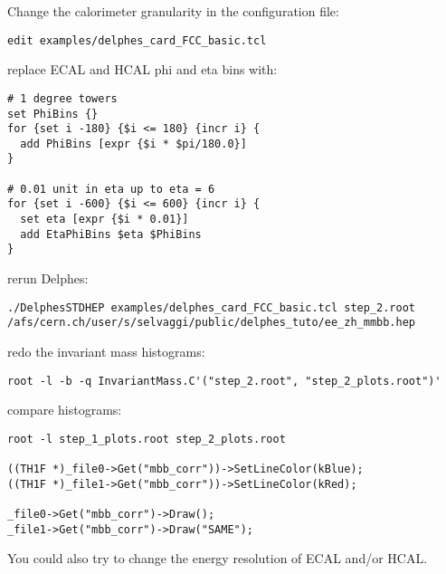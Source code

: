 \documentclass[a4paper,10pt]{article}
\begin{document}
Change the calorimeter granularity in the configuration file:
\begin{lstlisting}
edit examples/delphes_card_FCC_basic.tcl
\end{lstlisting}
replace ECAL and HCAL phi and eta bins with:

\begin{lstlisting}
# 1 degree towers
set PhiBins {}
for {set i -180} {$i <= 180} {incr i} {
  add PhiBins [expr {$i * $pi/180.0}]
}

# 0.01 unit in eta up to eta = 6
for {set i -600} {$i <= 600} {incr i} {
  set eta [expr {$i * 0.01}]
  add EtaPhiBins $eta $PhiBins
}
\end{lstlisting}

rerun Delphes:
\begin{lstlisting}
./DelphesSTDHEP examples/delphes_card_FCC_basic.tcl step_2.root /afs/cern.ch/user/s/selvaggi/public/delphes_tuto/ee_zh_mmbb.hep
\end{lstlisting}
redo the invariant mass histograms:
\begin{lstlisting}
root -l -b -q InvariantMass.C'("step_2.root", "step_2_plots.root")'
\end{lstlisting}
compare histograms:
\begin{lstlisting}
root -l step_1_plots.root step_2_plots.root
  
((TH1F *)_file0->Get("mbb_corr"))->SetLineColor(kBlue);
((TH1F *)_file1->Get("mbb_corr"))->SetLineColor(kRed);
  
_file0->Get("mbb_corr")->Draw();
_file1->Get("mbb_corr")->Draw("SAME");
\end{lstlisting}
You could also try to change the energy resolution of ECAL and/or HCAL.
\end{document}

